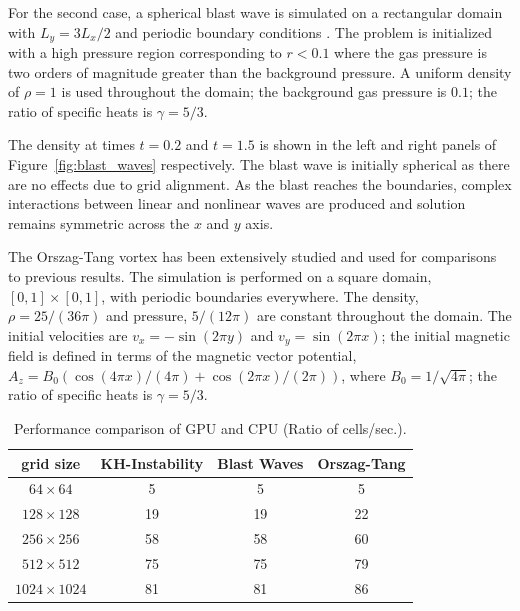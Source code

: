 For the second case, a spherical blast wave is simulated on a rectangular domain with $L_y = 3L_x/2$ and periodic boundary conditions \citep{Zachary:1994,Balsara:1999,Londrillo:2000}.  The problem is initialized with a high pressure region corresponding to $r < 0.1$ where the gas pressure is two orders of magnitude greater than the background pressure.  A uniform density of $\rho = 1$ is used throughout the domain; the background gas pressure is $0.1$; the ratio of specific heats is $\gamma = 5/3$.

The density at times $t = 0.2$ and $t = 1.5$ is shown in the left and right panels of Figure~\ref{fig:blast_waves} respectively.  The blast wave is initially spherical as there are no effects due to grid alignment.  As the blast reaches the boundaries, complex interactions between linear and nonlinear waves are produced and solution remains symmetric across the $x$ and $y$ axis.  

The Orszag-Tang vortex \citep{Orszag:1979} has been extensively studied and used for comparisons to previous results.  The simulation is performed on a square domain, $[0,1] \times [0,1]$, with periodic boundaries everywhere.  The density, $\rho = 25/(36\pi)$ and pressure, $5/(12\pi)$ are constant throughout the domain.  The initial velocities are $v_x = -\sin{(2\pi y)}$ and $v_y = \sin{(2\pi x)}$; the initial magnetic field is defined in terms of the magnetic vector potential, $A_z = B_0\left(\cos{(4\pi x)}/(4\pi) + \cos{(2\pi x)}/(2\pi)\right)$, where $B_0 = 1/\sqrt{4\pi}$; the ratio  of specific heats is $\gamma = 5/3$.


\begin{table}[htbp]\figSpace
\caption{Performance comparison of GPU and CPU (Ratio of  cells/sec.). }
\begin{tabular*}{\textwidth}{@{\extracolsep{\fill}} cccc}
\\ 
\hline 
\hline 
grid size & KH-Instability & Blast Waves & Orszag-Tang \\
\hline
$64\times64$ & 5 & 5 & 5 \\
$128\times128$ & 19 & 19 & 22 \\
$256\times256$ & 58 & 58 & 60 \\
$512\times512$ & 75 & 75 & 79 \\
$1024\times1024$ & 81 & 81 & 86 \\
\hline
\end{tabular*}
\label{tab:performance}
\figSpace
\end{table}

